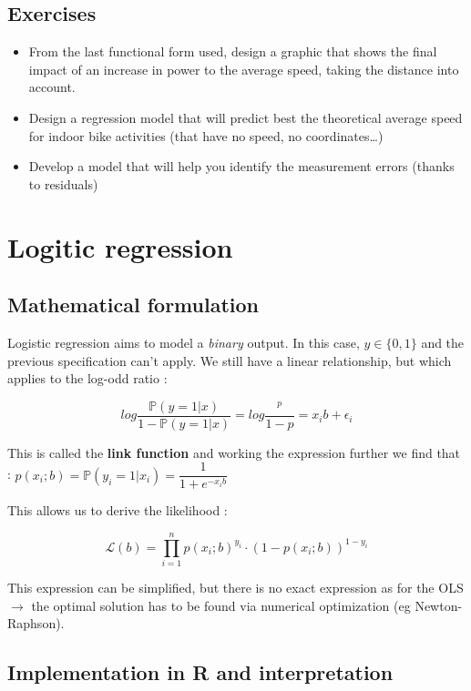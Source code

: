 \documentclass[
]{book}
\providecommand{\tightlist}{%
  \setlength{\itemsep}{0pt}\setlength{\parskip}{0pt}}
\begin{document}
\hypertarget{exercises}{%
\subsection{Exercises}\label{exercises}}

\begin{itemize}
\tightlist
\item
  From the last functional form used, design a graphic that shows the final impact of an increase in power to the average speed, taking the distance into account.
\item
  Design a regression model that will predict best the theoretical average speed for indoor bike activities (that have no speed, no coordinates\ldots)
\item
  Develop a model that will help you identify the measurement errors (thanks to residuals)
\end{itemize}

\hypertarget{logitic-regression}{%
\section{Logitic regression}\label{logitic-regression}}

\hypertarget{mathematical-formulation}{%
\subsection{Mathematical formulation}\label{mathematical-formulation}}

Logistic regression aims to model a \emph{binary} output. In this case, \(y \in \{0,1\}\) and the previous specification can't apply. We still have a linear relationship, but which applies to the log-odd ratio :

\[log \dfrac{\mathbb{P}(y=1|x)}{1-\mathbb{P}(y=1|x)} = log \dfrac{^p}{1-p} = x_ib + \epsilon_i\]

This is called the \textbf{link function} and working the expression further we find that : \(p(x_i;b) = \mathbb{P}(y_i=1|x_i) = \dfrac{1}{1+e^{-x_ib}}\)

This allows us to derive the likelihood :

\[\mathcal{L}(b) = \prod_{i=1}^n p(x_i;b)^{y_i} \cdot (1-p(x_i;b))^{1-y_i}\]

This expression can be simplified, but there is no exact expression as for the OLS \(\rightarrow\) the optimal solution has to be found via numerical optimization (eg Newton-Raphson).

\hypertarget{implementation-in-r-and-interpretation}{%
\subsection{Implementation in R and interpretation}\label{implementation-in-r-and-interpretation}}
\end{document}
